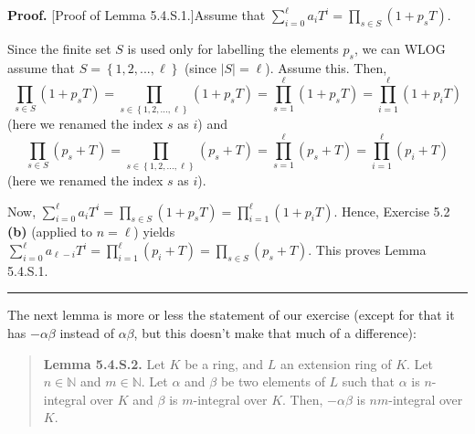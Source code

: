 \documentclass[numbers=enddot,12pt,final,onecolumn,notitlepage]{scrartcl}%
\newenvironment{proof}[1][Proof]{\noindent\textbf{#1.} }{\ \rule{0.5em}{0.5em}}
\begin{document}
\begin{proof}
[Proof of Lemma 5.4.S.1.]Assume that $\sum\limits_{i=0}^{\ell}a_{i}T^{i}%
=\prod\limits_{s\in S}\left(  1+p_{s}T\right)  $.

Since the finite set $S$ is used only for labelling the elements $p_{s}$, we
can WLOG assume that $S=\left\{  1,2,...,\ell\right\}  $ (since $\left\vert
S\right\vert =\ell$). Assume this. Then,
\[
\prod\limits_{s\in S}\left(  1+p_{s}T\right)  =\prod\limits_{s\in\left\{
1,2,...,\ell\right\}  }\left(  1+p_{s}T\right)  =\prod\limits_{s=1}^{\ell
}\left(  1+p_{s}T\right)  =\prod\limits_{i=1}^{\ell}\left(  1+p_{i}T\right)
\]
(here we renamed the index $s$ as $i$) and%
\[
\prod\limits_{s\in S}\left(  p_{s}+T\right)  =\prod\limits_{s\in\left\{
1,2,...,\ell\right\}  }\left(  p_{s}+T\right)  =\prod\limits_{s=1}^{\ell
}\left(  p_{s}+T\right)  =\prod\limits_{i=1}^{\ell}\left(  p_{i}+T\right)
\]
(here we renamed the index $s$ as $i$).

Now, $\sum\limits_{i=0}^{\ell}a_{i}T^{i}=\prod\limits_{s\in S}\left(
1+p_{s}T\right)  =\prod\limits_{i=1}^{\ell}\left(  1+p_{i}T\right)  $. Hence,
Exercise 5.2 \textbf{(b)} (applied to $n=\ell$) yields $\sum\limits_{i=0}%
^{\ell}a_{\ell-i}T^{i}=\prod\limits_{i=1}^{\ell}\left(  p_{i}+T\right)
=\prod\limits_{s\in S}\left(  p_{s}+T\right)  $. This proves Lemma 5.4.S.1.
\end{proof}

The next lemma is more or less the statement of our exercise (except for that
it has $-\alpha\beta$ instead of $\alpha\beta$, but this doesn't make that
much of a difference):

\begin{quote}
\textbf{Lemma 5.4.S.2.} Let $K$ be a ring, and $L$ an extension ring of $K$.
Let $n\in\mathbb{N}$ and $m\in\mathbb{N}$. Let $\alpha$ and $\beta$ be two
elements of $L$ such that $\alpha$ is $n$-integral over $K$ and $\beta$ is
$m$-integral over $K$. Then, $-\alpha\beta$ is $nm$-integral over $K$.
\end{quote}
\end{document}
